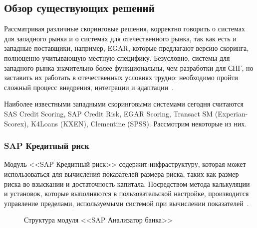\subsection{Обзор существующих решений}

Рассматривая различные скоринговые решения, корректно говорить о системах для западного рынка
и о системах для отечественного рынка, так как есть и западные поставщики,
например, EGAR, которые предлагают версию скоринга, полноценно учитывающую местную специфику.
Безусловно, системы для западного рынка значительно более функциональны,
чем разработки для СНГ, но заставить их работать в отечественных условиях трудно:
необходимо пройти сложный процесс внедрения, интеграции и адаптации~\cite{rumyantsev2006}.

Наиболее известными западными скоринговыми системами сегодня считаются
SAS Credit Scoring, SAP Credit Risk, EGAR Scoring, Transact SM (Experian-Scorex),
K4Loans (KXEN), Clementine (SPSS). Рассмотрим некоторые из них.

\subsubsection{SAP Кредитный риск}

Модуль <<SAP Кредитный риск>> содержит инфраструктуру, которая может использоваться
для вычисления показателей размера риска, таких как размер риска во взыскании и достаточность капитала.
Посредством метода калькуляции и установок, которые выполняются в пользовательской настройке,
производится управление пределами, используемыми системой при вычислении показателей~\cite{sap_credit_risk}.

\begin{figure}[h!]
  \centering
  \caption{Структура модуля <<SAP Анализатор банка>>}
  \label{fig:sap_structure}
\end{figure}

